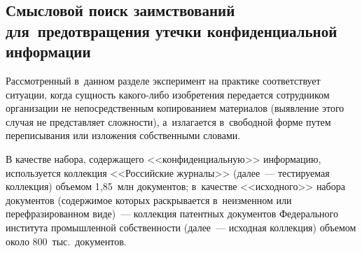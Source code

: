\begin{multicols}{2}
\section{Смысловой поиск заимствований для~предотвращения 
утечки конфиденциальной информации} %

\vspace*{-6pt}
     
  Рассмотренный в~данном разделе эксперимент на практике соответствует 
ситуации, когда сущность 
 ка\-ко\-го-ли\-бо изобретения передается сотрудником организации не 
непосредственным копированием материалов (выявление этого случая не 
представляет сложности), а~излагается в~свободной форме путем 
переписывания или изложения собственными словами.
  
  В качестве набора, содержащего <<конфиденциальную>> информацию, 
используется коллекция <<Российские журналы>> (далее~--- тестируемая 
коллекция) объемом 1,85~млн документов; в~качестве <<исходного>> набора 
документов (содержимое которых раскрывается в~неизменном или 
перефразированном виде)~--- коллекция патентных документов Федерального института промышленной собственности 
(далее~--- исходная коллекция) объемом около 800~тыс.\ документов. 
  

\end{multicols}
